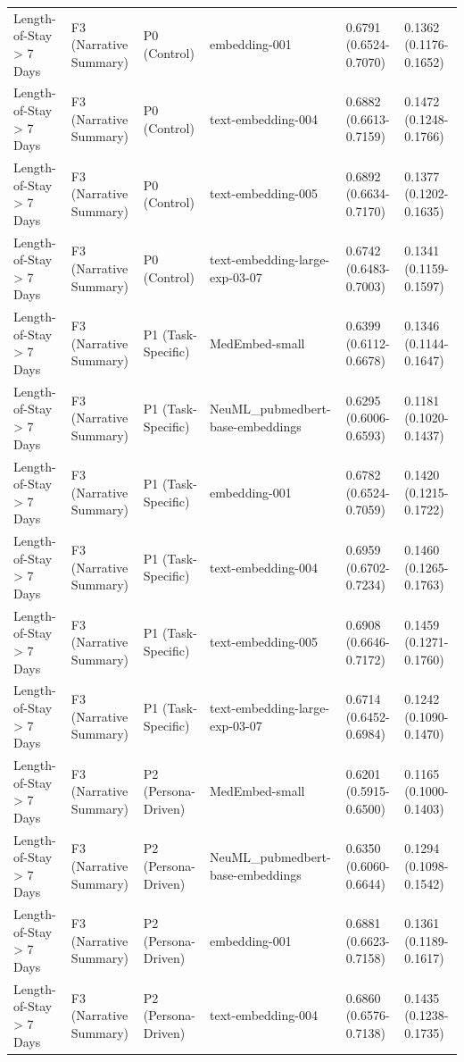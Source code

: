 \begin{tabular}{llllll}
Length-of-Stay \textgreater{} 7 Days & F3 (Narrative Summary) & P0 (Control) & embedding-001 & 0.6791 (0.6524-0.7070) & 0.1362 (0.1176-0.1652) \\
Length-of-Stay \textgreater{} 7 Days & F3 (Narrative Summary) & P0 (Control) & text-embedding-004 & 0.6882 (0.6613-0.7159) & 0.1472 (0.1248-0.1766) \\
Length-of-Stay \textgreater{} 7 Days & F3 (Narrative Summary) & P0 (Control) & text-embedding-005 & 0.6892 (0.6634-0.7170) & 0.1377 (0.1202-0.1635) \\
Length-of-Stay \textgreater{} 7 Days & F3 (Narrative Summary) & P0 (Control) & text-embedding-large-exp-03-07 & 0.6742 (0.6483-0.7003) & 0.1341 (0.1159-0.1597) \\
Length-of-Stay \textgreater{} 7 Days & F3 (Narrative Summary) & P1 (Task-Specific) & MedEmbed-small & 0.6399 (0.6112-0.6678) & 0.1346 (0.1144-0.1647) \\
Length-of-Stay \textgreater{} 7 Days & F3 (Narrative Summary) & P1 (Task-Specific) & NeuML\_pubmedbert-base-embeddings & 0.6295 (0.6006-0.6593) & 0.1181 (0.1020-0.1437) \\
Length-of-Stay \textgreater{} 7 Days & F3 (Narrative Summary) & P1 (Task-Specific) & embedding-001 & 0.6782 (0.6524-0.7059) & 0.1420 (0.1215-0.1722) \\
Length-of-Stay \textgreater{} 7 Days & F3 (Narrative Summary) & P1 (Task-Specific) & text-embedding-004 & 0.6959 (0.6702-0.7234) & 0.1460 (0.1265-0.1763) \\
Length-of-Stay \textgreater{} 7 Days & F3 (Narrative Summary) & P1 (Task-Specific) & text-embedding-005 & 0.6908 (0.6646-0.7172) & 0.1459 (0.1271-0.1760) \\
Length-of-Stay \textgreater{} 7 Days & F3 (Narrative Summary) & P1 (Task-Specific) & text-embedding-large-exp-03-07 & 0.6714 (0.6452-0.6984) & 0.1242 (0.1090-0.1470) \\
Length-of-Stay \textgreater{} 7 Days & F3 (Narrative Summary) & P2 (Persona-Driven) & MedEmbed-small & 0.6201 (0.5915-0.6500) & 0.1165 (0.1000-0.1403) \\
Length-of-Stay \textgreater{} 7 Days & F3 (Narrative Summary) & P2 (Persona-Driven) & NeuML\_pubmedbert-base-embeddings & 0.6350 (0.6060-0.6644) & 0.1294 (0.1098-0.1542) \\
Length-of-Stay \textgreater{} 7 Days & F3 (Narrative Summary) & P2 (Persona-Driven) & embedding-001 & 0.6881 (0.6623-0.7158) & 0.1361 (0.1189-0.1617) \\
Length-of-Stay \textgreater{} 7 Days & F3 (Narrative Summary) & P2 (Persona-Driven) & text-embedding-004 & 0.6860 (0.6576-0.7138) & 0.1435 (0.1238-0.1735) \\

\end{tabular}
